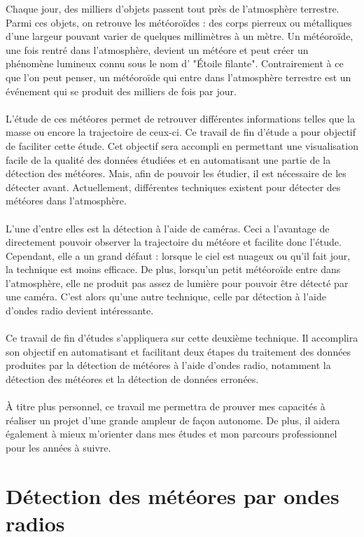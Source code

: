 \documentclass[11pt]{article}
\begin{document}
Chaque jour, des milliers d'objets passent tout près de l'atmosphère terrestre.
Parmi ces objets, on retrouve les météoroïdes : des corps pierreux ou métalliques d'une largeur pouvant varier de quelques millimètres à un mètre.
Un météoroïde, une fois rentré dans l'atmosphère, devient un météore et peut créer un phénomène lumineux connu sous le nom d' "Étoile filante".
Contrairement à ce que l'on peut penser, un météoroïde qui entre dans l'atmosphère terrestre est un événement qui se produit des milliers de fois par jour.
\\
\\
L'étude de ces météores permet de retrouver différentes informations telles que la masse ou encore la trajectoire de ceux-ci.
Ce travail de fin d'étude a pour objectif de faciliter cette étude.
Cet objectif sera accompli en permettant une visualisation facile de la qualité des données étudiées et en automatisant une partie de la détection des météores.
Mais, afin de pouvoir les étudier, il est nécessaire de les détecter avant.
Actuellement, différentes techniques existent pour détecter des météores dans l'atmosphère.
\\
\\
L'une d'entre elles est la détection à l'aide de caméras.
Ceci a l'avantage de directement pouvoir observer la trajectoire du météore et facilite donc l'étude.
Cependant, elle a un grand défaut : lorsque le ciel est nuageux ou qu'il fait jour, la technique est moins efficace.
De plus, lorsqu'un petit météoroïde entre dans l'atmosphère, elle ne produit pas assez de lumière pour pouvoir être détecté par une caméra.
C'est alors qu'une autre technique, celle par détection à l'aide d'ondes radio devient intéressante.
\\
\\
Ce travail de fin d'études s'appliquera sur cette deuxième technique.
Il accomplira son objectif en automatisant et facilitant deux étapes du traitement des données produites par la détection de météores à l'aide d'ondes radio, notamment la détection des météores et la détection de données erronées.\\
\\
À titre plus personnel, ce travail me permettra de prouver mes capacités à réaliser un projet d'une grande ampleur de façon autonome.
De plus, il aidera également à mieux m'orienter dans mes études et mon parcours professionnel pour les années à suivre.

\newpage

\section{Détection des météores par ondes radios}
\end{document}

